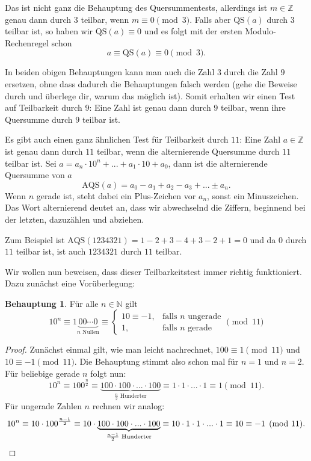 \documentclass[a4paper,ngerman,12pt]{scrartcl}
\newcommand{\N}{\mathbb{N}}
\newcommand{\Z}{\mathbb{Z}}
\theoremstyle{definition}
\newtheorem{satz}{Behauptung}
\begin{document}
Das ist nicht ganz die Behauptung des Quersummentests, allerdings ist $m \in \Z$ genau dann durch $3$ teilbar, wenn $m \equiv 0 \pmod{3}$. Falls aber $\mathrm{QS}(a)$ durch $3$ teilbar ist, so haben wir $\mathrm{QS}(a) \equiv 0$ und es folgt mit der ersten Modulo-Rechenregel schon
\[ a \equiv \mathrm{QS}(a) \equiv 0 \pmod{3}. \]

In beiden obigen Behauptungen kann man auch die Zahl $3$ durch die Zahl $9$ ersetzen, ohne dass dadurch die Behauptungen falsch werden (gehe die Beweise durch und überlege dir, warum das möglich ist). Somit erhalten wir einen Test auf Teilbarkeit durch $9$: Eine Zahl ist genau dann durch $9$ teilbar, wenn ihre Quersumme durch $9$ teilbar ist.

Es gibt auch einen ganz ähnlichen Test für Teilbarkeit durch $11$: Eine Zahl $a \in \Z$ ist genau dann durch $11$ teilbar, wenn die alternierende Quersumme durch $11$ teilbar ist. Sei $a = a_n \cdot 10^n + ... + a_1 \cdot 10 + a_0$, dann ist die alternierende Quersumme von $a$
\[ \mathrm{AQS}(a) = a_0 - a_1 + a_2 - a_3 + ... \pm a_n. \]
Wenn $n$ gerade ist, steht dabei ein Plus-Zeichen vor $a_n$, sonst ein Minuszeichen. Das Wort alternierend deutet an, dass wir abwechselnd die Ziffern, beginnend bei der letzten, dazuzählen und abziehen.

Zum Beispiel ist $\mathrm{AQS}(1234321) = 1 - 2 + 3 - 4 + 3 - 2 + 1 = 0$ und da $0$ durch $11$ teilbar ist, ist auch $1234321$ durch $11$ teilbar.

Wir wollen nun beweisen, dass dieser Teilbarkeitstest immer richtig funktioniert. Dazu zunächst eine Vorüberlegung:

\begin{satz}
  Für alle $n \in \N$ gilt
  \[
    10^n \equiv 1\underbrace{00\cdots0}_{n \text{ Nullen}} \equiv \begin{cases}
      10 \equiv -1, & \text{falls $n$ ungerade}\\
      1, & \text{falls $n$ gerade}
    \end{cases} \pmod{11}
  \]
\end{satz}

\begin{proof}
  Zunächst einmal gilt, wie man leicht nachrechnet, $100 \equiv 1 \pmod{11}$ und $10 \equiv -1 \pmod{11}$. Die Behauptung stimmt also schon mal für $n{=}1$ und $n{=}2$. Für beliebige gerade $n$ folgt nun:
  \[ 10^n \equiv 100^{\frac{n}{2}} \equiv \underbrace{100 \cdot 100 \cdot ... \cdot 100}_{\text{$\tfrac{n}{2}$ Hunderter}} \equiv 1 \cdot 1 \cdot ... \cdot 1 \equiv 1 \pmod{11}. \]
  Für ungerade Zahlen $n$ rechnen wir analog:
  \[ 10^n \equiv 10 \cdot 100^{\frac{n-1}{2}} \equiv 10 \cdot \underbrace{100 \cdot 100 \cdot ... \cdot 100}_{\text{$\tfrac{n-1}{2}$ Hunderter}} \equiv 10 \cdot 1 \cdot 1 \cdot ... \cdot 1 \equiv 10 \equiv -1 \pmod{11}.\qedhere \]
\end{proof}
\end{document}
